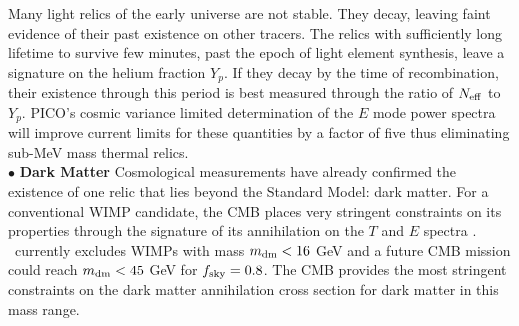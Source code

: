 \documentclass[PICOReport.tex]{subfiles}
\begin{document}
Many light relics of the early universe are not stable. They decay, 
leaving faint evidence of their past existence on other tracers. The relics with sufficiently long lifetime to survive few minutes, 
past the epoch of light element synthesis, leave a signature on the helium fraction $Y_p$.  If they decay 
by the time of recombination, their existence through this period is best measured through the ratio of ${N_{\rm eff}}$ to $Y_p$. 
PICO's cosmic variance limited determination 
of the $E$ mode power spectra will improve current limits for these quantities by
a factor of five thus eliminating sub-MeV mass thermal relics.  \\
$\bullet$ {\bf Dark Matter} \hspace{0.1in} Cosmological measurements have already confirmed the existence of one relic that 
lies beyond the Standard Model: dark matter.  For a conventional WIMP candidate, the CMB places very stringent 
constraints on its properties through the signature of its annihilation on the $T$ and $E$ 
spectra \citep{Peebles2000, Chen2004, Padmanabhan2005}.  \planck\ currently excludes WIMPs with mass 
$m_{\rm dm}< 16$ GeV  and a future CMB mission  could reach $m_{\rm dm} < 45$ GeV for $f_{\rm sky} =0.8$.  
The CMB provides the most stringent constraints on the dark matter annihilation cross section for dark matter 
in this mass range.   



\end{document}
